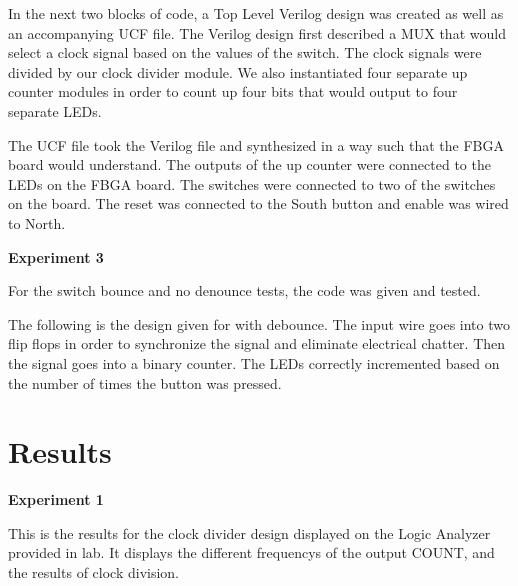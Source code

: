 \documentclass[a4paper,12pt]{article}
\begin{document}
  
  
  In the next two blocks of code, a Top Level Verilog design was created as well as an accompanying UCF file. The Verilog design first described a MUX that would select a clock signal based on the values of the switch. The clock signals were divided by our clock divider module. We also instantiated four separate up counter modules in order to count up four bits that would output to four separate LEDs.
  
  The UCF file took the Verilog file and synthesized in a way such that the FBGA board would understand. The outputs of the up counter were connected to the LEDs on the FBGA board. The switches were connected to two of the switches on the board. The reset was connected to the South button and enable was wired to North.  

  

  

  \textbf{Experiment 3}
  
  For the switch bounce and no denounce tests, the code was given and tested.
  
  The following is the design given for with debounce. The input wire goes into two flip flops in order to synchronize the signal and eliminate electrical chatter. Then the 
  signal goes into a binary counter. The LEDs correctly incremented based on the number of times the button was pressed. 

  

\section*{Results}

  \textbf{Experiment 1}
  
  This is the results for the clock divider design displayed on the Logic Analyzer provided in lab. It displays the different frequencys of the output COUNT, and the results of clock division.
\end{document}

